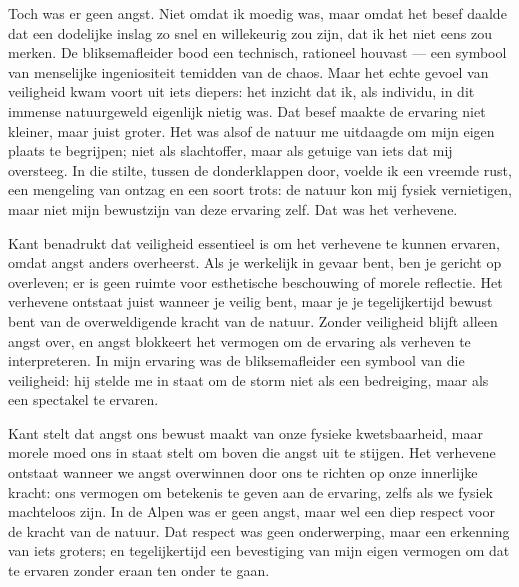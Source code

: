 \begin{mdframed}[leftmargin=0pt,rightmargin=0pt,backgroundcolor=blue!6,linecolor=white,innertopmargin=6pt,innerbottommargin=6pt]
Toch was er geen angst. Niet omdat ik moedig was, maar omdat het besef daalde dat een dodelijke inslag zo snel en willekeurig zou zijn, dat ik het niet eens zou merken. De bliksemafleider bood een technisch, rationeel houvast — een symbool van menselijke ingeniositeit temidden van de chaos. Maar het echte gevoel van veiligheid kwam voort uit iets diepers: het inzicht dat ik, als individu, in dit immense natuurgeweld eigenlijk nietig was. Dat besef maakte de ervaring niet kleiner, maar juist groter. Het was alsof de natuur me uitdaagde om mijn eigen plaats te begrijpen; niet als slachtoffer, maar als getuige van iets dat mij oversteeg. In die stilte, tussen de donderklappen door, voelde ik een vreemde rust, een mengeling van ontzag en een soort trots: de natuur kon mij fysiek vernietigen, maar niet mijn bewustzijn van deze ervaring zelf. Dat was het verhevene.

Kant benadrukt dat veiligheid essentieel is om het verhevene te kunnen ervaren, omdat angst anders overheerst. Als je werkelijk in gevaar bent, ben je gericht op overleven; er is geen ruimte voor esthetische beschouwing of morele reflectie. Het verhevene ontstaat juist wanneer je veilig bent, maar je je tegelijkertijd bewust bent van de overweldigende kracht van de natuur. Zonder veiligheid blijft alleen angst over, en angst blokkeert het vermogen om de ervaring als verheven te interpreteren. In mijn ervaring was de bliksemafleider een symbool van die veiligheid: hij stelde me in staat om de storm niet als een bedreiging, maar als een spectakel te ervaren.

Kant stelt dat angst ons bewust maakt van onze fysieke kwetsbaarheid, maar morele moed ons in staat stelt om boven die angst uit te stijgen. Het verhevene ontstaat wanneer we angst overwinnen door ons te richten op onze innerlijke kracht: ons vermogen om betekenis te geven aan de ervaring, zelfs als we fysiek machteloos zijn. In de Alpen was er geen angst, maar wel een diep respect voor de kracht van de natuur. Dat respect was geen onderwerping, maar een erkenning van iets groters; en tegelijkertijd een bevestiging van mijn eigen vermogen om dat te ervaren zonder eraan ten onder te gaan.


\end{mdframed}
